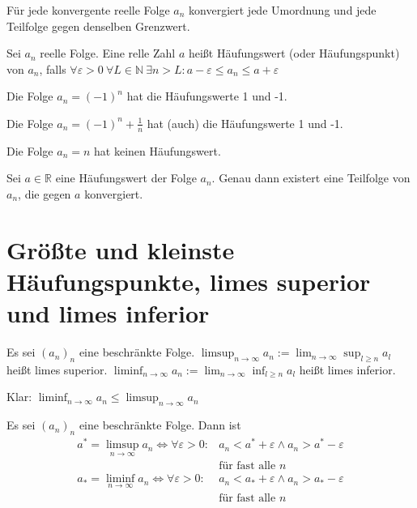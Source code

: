\begin{theorem}
  Für jede konvergente reelle Folge $a_n$ konvergiert jede Umordnung und jede Teilfolge gegen denselben Grenzwert.
\end{theorem}

\begin{definition}
  Sei $a_n$ reelle Folge. Eine relle Zahl $a$ heißt Häufungswert (oder Häufungspunkt) von $a_n$, falls $\forall \varepsilon > 0\: \forall L \in \mathbb{N}\: \exists n > L: a-\varepsilon \le a_n \le a+\varepsilon$
\end{definition}

\begin{example}
  Die Folge $a_n = (-1)^n$ hat die Häufungswerte 1 und -1.

  Die Folge $a_n = (-1)^n + \frac{1}{n}$ hat (auch) die Häufungswerte 1 und -1.

  Die Folge $a_n = n$ hat keinen Häufungswert.
\end{example}

\begin{theorem}
  Sei $a \in \mathbb{R}$ eine Häufungswert der Folge $a_n$. Genau dann existert eine Teilfolge von $a_n$, die gegen $a$ konvergiert.
\end{theorem}

\section{Größte und kleinste Häufungspunkte, limes superior und limes inferior}
\begin{definition}
  Es sei $(a_n)_n$ eine beschränkte Folge.
  $\limsup_{n \to \infty} a_n := \lim_{n \to \infty} \sup_{l \ge n} a_l$ heißt limes superior.
  $\liminf_{n \to \infty} a_n := \lim_{n \to \infty} \inf_{l \ge n} a_l$ heißt limes inferior.
\end{definition}
\begin{remark}
  Klar: $\liminf_{n \to \infty} a_n \le \limsup_{n \to \infty} a_n$
\end{remark}

\begin{lemma}
  Es sei $(a_n)_n$ eine beschränkte Folge. Dann ist
  \begin{align*}
    a^{*} = \limsup_{n \to \infty} a_n \iff \forall \varepsilon > 0:& a_n < a^{*} + \varepsilon \wedge a_n > a^{*} - \varepsilon \\
    \,&\text{für fast alle $n$}\\
    a_{*} = \liminf_{n \to \infty} a_n \iff \forall \varepsilon > 0:& a_n < a_{*} + \varepsilon \wedge a_n > a_{*} - \varepsilon \\
    \,&\text{für fast alle $n$}
  \end{align*}
\end{lemma}

